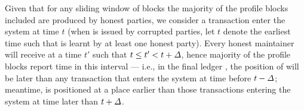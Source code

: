 Given that for any sliding window of \PBWindowLen blocks the majority of the profile blocks included are produced by honest parties, we consider a transaction \tx enter the system at time $t$ (when \tx is issued by corrupted parties, let $t$ denote the earliest time such that \tx is learnt by at least one honest party).
%
Every honest maintainer will receive \tx at a time $t'$ such that $t \le t' < t + \varDelta$, hence majority of the profile blocks report time in this interval --- i.e., in the final ledger \ledger, the position of \tx will be later than any transaction that enters the system at time before $t - \varDelta$; meantime, \tx is positioned at a place earlier than those transactions entering the system at time later than $t + \varDelta$.
